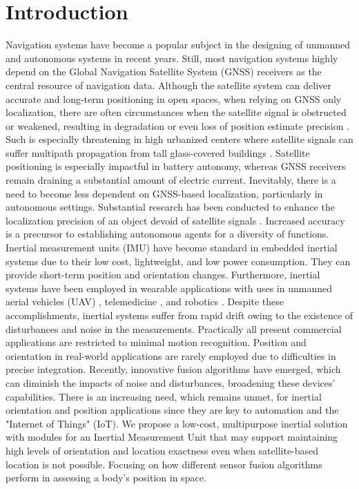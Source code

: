 \section{Introduction}
Navigation systems have become a popular subject in the designing of unmanned and autonomous systems in recent years. Still, most navigation systems highly depend on the Global Navigation Satellite System (GNSS) receivers as the central resource of navigation data. Although the satellite system can deliver accurate and long-term positioning in open spaces, when relying on GNSS only localization, there are often circumstances when the satellite signal is obstructed or weakened, resulting in degradation or even loss of position estimate precision \cite{ioannides2016known}. Such is especially threatening in high urbanized centers where satellite signals can suffer multipath propagation from tall glass-covered buildings \cite{omar2016integration}. Satellite positioning is especially impactful in battery autonomy, whereas GNSS receivers remain draining a substantial amount of electric current. Inevitably, there is a need to become less dependent on GNSS-based localization, particularly in autonomous settings. Substantial research has been conducted to enhance the localization precision of an object devoid of satellite signals \cite{nassar2004improving}\cite{dewhirst2016improving}\cite{kao1991integration}\cite{coyte2013displacement}\cite{wong1988high}. Increased accuracy is a precursor to establishing autonomous agents for a diversity of functions. Inertial measurement units (IMU) have become standard in embedded inertial systems due to their low cost, lightweight, and low power consumption. They can provide short-term position and orientation changes. Furthermore, inertial systems have been employed in wearable applications with uses in unmanned aerial vehicles (UAV) \cite{hetenyi2016sensor}\cite{luo2013uav}\cite{sharma2014sensor}, telemedicine \cite{madgwick2020extended}, and robotics \cite{wilson2019formulation}. Despite these accomplishments, inertial systems suffer from rapid drift owing to the existence of disturbances and noise in the measurements. Practically all present commercial applications are restricted to minimal motion recognition. Position and orientation in real-world applications are rarely employed due to difficulties in precise integration. Recently, innovative fusion algorithms have emerged, which can diminish the impacts of noise and disturbances, broadening these devices' capabilities. There is an increasing need, which remains unmet, for inertial orientation and position applications since they are key to automation and the "Internet of Things" (IoT).
We propose a low-cost, multipurpose inertial solution with modules for an Inertial Measurement Unit that may support maintaining high levels of orientation and location exactness even when satellite-based location is not possible. Focusing on how different sensor fusion algorithms perform in assessing a body's position in space.

